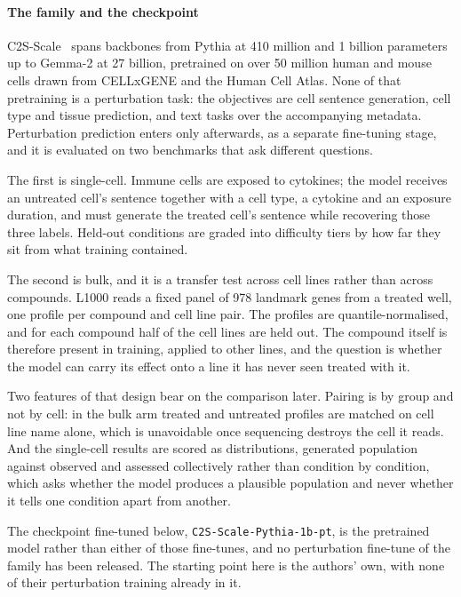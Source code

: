 \paragraph{The family and the checkpoint}
C2S-Scale~\cite{c2sscale} spans backbones from Pythia at 410 million and 1
billion parameters up to Gemma-2 at 27 billion, pretrained on over 50 million
human and mouse cells drawn from CELLxGENE and the Human Cell Atlas. None of
that pretraining is a perturbation task: the objectives are cell sentence
generation, cell type and tissue prediction, and text tasks over the
accompanying metadata. Perturbation prediction enters only afterwards, as a
separate fine-tuning stage, and it is evaluated on two benchmarks that ask
different questions.

The first is single-cell. Immune cells are exposed to cytokines; the model
receives an untreated cell's sentence together with a cell type, a cytokine and
an exposure duration, and must generate the treated cell's sentence while
recovering those three labels. Held-out conditions are graded into difficulty
tiers by how far they sit from what training contained.

The second is bulk, and it is a transfer test across cell lines rather than
across compounds. L1000 reads a fixed panel of 978 landmark genes from a
treated well, one profile per compound and cell line pair. The profiles are
quantile-normalised, and for each compound half of the cell lines are held out.
The compound itself is therefore present in training, applied to other lines,
and the question is whether the model can carry its effect onto a line it has
never seen treated with it.

Two features of that design bear on the comparison later. Pairing is by group
and not by cell: in the bulk arm treated and untreated profiles are matched on
cell line name alone, which is unavoidable once sequencing destroys the cell it
reads. And the single-cell results are scored as distributions, generated
population against observed and assessed collectively rather than condition by
condition, which asks whether the model produces a plausible population and
never whether it tells one condition apart from another.

The checkpoint fine-tuned below, \texttt{C2S-Scale-Pythia-1b-pt}, is the
pretrained model rather than either of those fine-tunes, and no perturbation
fine-tune of the family has been released. The starting point here is the
authors' own, with none of their perturbation training already in it.
